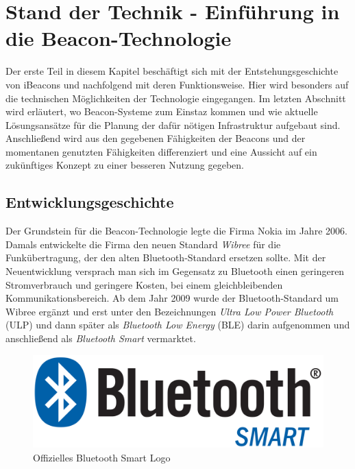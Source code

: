\chapter{Stand der Technik - Einführung in die Beacon-Technologie}
Der erste Teil in diesem Kapitel beschäftigt sich mit der Entstehungsgeschichte von iBeacons und nachfolgend mit deren Funktionsweise. Hier wird besonders auf die technischen Möglichkeiten der Technologie eingegangen. Im letzten Abschnitt wird erläutert, wo Beacon-Systeme zum Einstaz kommen und wie aktuelle Lösungsansätze für die Planung der dafür nötigen Infrastruktur aufgebaut sind. Anschließend wird aus den gegebenen Fähigkeiten der Beacons und der momentanen genutzten Fähigkeiten differenziert und eine Aussicht auf ein zukünftiges Konzept zu einer besseren Nutzung gegeben.

\section{Entwicklungsgeschichte}
Der Grundstein für die Beacon-Technologie legte die Firma Nokia im Jahre 2006. Damals entwickelte die Firma den neuen Standard \textit{Wibree} für die Funkübertragung,
der den alten Bluetooth-Standard ersetzen sollte. Mit der Neuentwicklung versprach man sich im Gegensatz zu Bluetooth einen geringeren Stromverbrauch und geringere Kosten, bei einem gleichbleibenden Kommunikationsbereich. Ab dem Jahr 2009 wurde der Bluetooth-Standard um Wibree ergänzt und erst unter den Bezeichnungen \textit{Ultra Low Power Bluetooth} (ULP) und dann später als \textit{Bluetooth Low Energy} (BLE) darin aufgenommen \cite{Wib2BLE} und anschließend als \textit{Bluetooth Smart} vermarktet. \par\bigskip
\begin{figure}[H]
\centering
\includegraphics[scale=0.07]{Bilder/BLE.png} 
\caption{Offizielles Bluetooth Smart Logo \cite{BLElogo}}
\label{BLElogo}
\end{figure}
